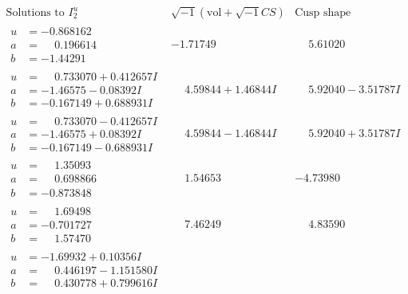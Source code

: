 \documentclass[1p]{elsarticle_modified}
\theoremstyle{definition}
\newcommand{\I}{\sqrt{-1}}
\begin{document}
$$\begin{array}{c|c|c}  
\text{Solutions to }I^u_{2}& \I (\text{vol} + \sqrt{-1}CS) & \text{Cusp shape}\\
 \hline 
\begin{aligned}
u &= -0.868162\phantom{ +0.000000I} \\
a &= \phantom{-}0.196614\phantom{ +0.000000I} \\
b &= -1.44291\phantom{ +0.000000I}\end{aligned}
 & -1.71749\phantom{ +0.000000I} & \phantom{-}5.61020\phantom{ +0.000000I} \\ \hline\begin{aligned}
u &= \phantom{-}0.733070 + 0.412657 I \\
a &= -1.46575 - 0.08392 I \\
b &= -0.167149 + 0.688931 I\end{aligned}
 & \phantom{-}4.59844 + 1.46844 I & \phantom{-}5.92040 - 3.51787 I \\ \hline\begin{aligned}
u &= \phantom{-}0.733070 - 0.412657 I \\
a &= -1.46575 + 0.08392 I \\
b &= -0.167149 - 0.688931 I\end{aligned}
 & \phantom{-}4.59844 - 1.46844 I & \phantom{-}5.92040 + 3.51787 I \\ \hline\begin{aligned}
u &= \phantom{-}1.35093\phantom{ +0.000000I} \\
a &= \phantom{-}0.698866\phantom{ +0.000000I} \\
b &= -0.873848\phantom{ +0.000000I}\end{aligned}
 & \phantom{-}1.54653\phantom{ +0.000000I} & -4.73980\phantom{ +0.000000I} \\ \hline\begin{aligned}
u &= \phantom{-}1.69498\phantom{ +0.000000I} \\
a &= -0.701727\phantom{ +0.000000I} \\
b &= \phantom{-}1.57470\phantom{ +0.000000I}\end{aligned}
 & \phantom{-}7.46249\phantom{ +0.000000I} & \phantom{-}4.83590\phantom{ +0.000000I} \\ \hline\begin{aligned}
u &= -1.69932 + 0.10356 I \\
a &= \phantom{-}0.446197 - 1.151580 I \\
b &= \phantom{-}0.430778 + 0.799616 I\end{aligned}

\end{array}$$
\end{document}
